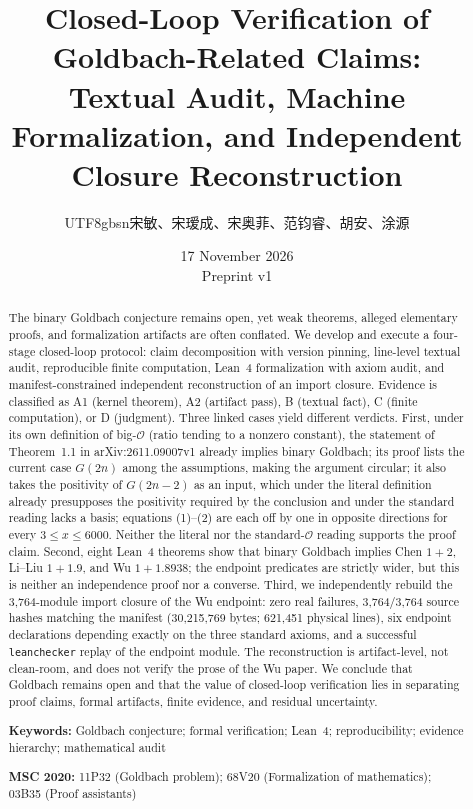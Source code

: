 \documentclass[11pt,a4paper]{article}
\title{\bfseries Closed-Loop Verification of Goldbach-Related Claims:\\[2pt]
Textual Audit, Machine Formalization, and Independent Closure Reconstruction}
\author{\begin{CJK}{UTF8}{gbsn}宋敏、宋瑷成、宋奥菲、范钧睿、胡安、涂源\end{CJK}}
\date{17 November 2026\\[2pt]
\small Preprint v1}
\theoremstyle{plain}
\theoremstyle{definition}
\begin{document}
\maketitle

\begin{abstract}
\noindent
The binary Goldbach conjecture remains open, yet weak theorems, alleged elementary proofs, and formalization artifacts are often conflated. We develop and execute a four-stage closed-loop protocol: claim decomposition with version pinning, line-level textual audit, reproducible finite computation, Lean~4 formalization with axiom audit, and manifest-constrained independent reconstruction of an import closure. Evidence is classified as A1 (kernel theorem), A2 (artifact pass), B (textual fact), C (finite computation), or D (judgment). Three linked cases yield different verdicts. First, under its own definition of big-$\mathcal O$ (ratio tending to a nonzero constant), the statement of Theorem~1.1 in arXiv:2611.09007v1 already implies binary Goldbach; its proof lists the current case $G(2n)$ among the assumptions, making the argument circular; it also takes the positivity of $G(2n-2)$ as an input, which under the literal definition already presupposes the positivity required by the conclusion and under the standard reading lacks a basis; equations (1)--(2) are each off by one in opposite directions for every $3\le x\le 6000$. Neither the literal nor the standard-$\mathcal O$ reading supports the proof claim. Second, eight Lean~4 theorems show that binary Goldbach implies Chen $1+2$, Li--Liu $1+1.9$, and Wu $1+1.8938$; the endpoint predicates are strictly wider, but this is neither an independence proof nor a converse. Third, we independently rebuild the 3,764-module import closure of the Wu endpoint: zero real failures, 3,764/3,764 source hashes matching the manifest (30,215,769 bytes; 621,451 physical lines), six endpoint declarations depending exactly on the three standard axioms, and a successful \texttt{leanchecker} replay of the endpoint module. The reconstruction is artifact-level, not clean-room, and does not verify the prose of the Wu paper. We conclude that Goldbach remains open and that the value of closed-loop verification lies in separating proof claims, formal artifacts, finite evidence, and residual uncertainty.

\vspace{0.6em}
\noindent\textbf{Keywords:} Goldbach conjecture; formal verification; Lean~4; reproducibility; evidence hierarchy; mathematical audit

\vspace{0.3em}
\noindent\textbf{MSC 2020:} 11P32 (Goldbach problem); 68V20 (Formalization of mathematics); 03B35 (Proof assistants)
\end{abstract}
\end{document}
